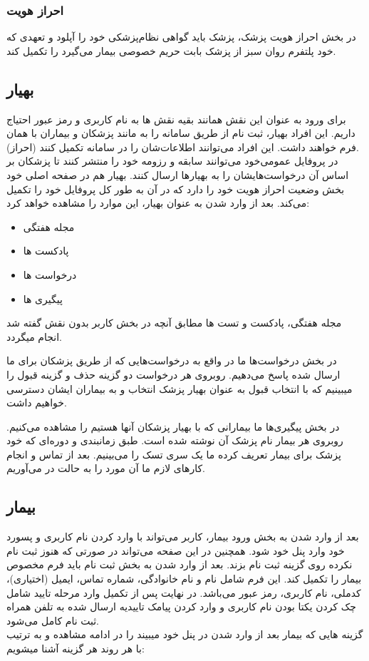 \documentclass[a4paper]{article}
\begin{document}
		\subsubsection{احراز هویت}
		در بخش احراز هویت پزشک، پزشک باید گواهی نظام‌پزشکی خود را آپلود و تعهدی که خود پلتفرم روان سبز از پزشک بابت حریم خصوصی بیمار می‌گیرد را تکمیل کند.
		
	\subsection{بهیار}

برای ورود به عنوان این نقش همانند بقیه نقش ها به نام کاربری و رمز عبور احتیاج داریم.
این افراد بهیار، ثبت نام از طریق سامانه را به مانند پزشکان و بیماران با همان فرم خواهند داشت. این افراد می‌توانند اطلاعات‌شان را در سامانه تکمیل کنند (احراز).\\
در پروفایل عمومی‌خود می‌توانند سابقه و رزومه خود را منتشر کنند تا پزشکان بر اساس آن درخواست‌هایشان را به بهیار‌ها ارسال کنند.
بهیار هم در صفحه اصلی خود بخش وضعیت احراز هویت خود را دارد که در آن به طور کل پروفایل خود را تکمیل می‌کند.
بعد از وارد شدن به عنوان بهیار، این موارد را مشاهده خواهد کرد:
		
		\begin{itemize}
			\item مجله هفتگی
			\item پادکست ها
			\item درخواست ها
			\item پیگیری ها
		\end{itemize}

مجله هفتگی، پادکست و تست ها مطابق آنچه در بخش کاربر بدون نقش گفته شد انجام میگردد.

در بخش درخواست‌ها ما در واقع به درخواست‌هایی که از طریق پزشکان برای ما ارسال شده پاسخ می‌دهیم. روبروی هر درخواست دو گزینه حذف و گزینه قبول را میبینیم که با انتخاب قبول به عنوان بهیار پزشک انتخاب و به بیماران ایشان دسترسی خواهیم داشت.

در بخش پیگیری‌ها ما بیمارانی که با بهیار پزشکان آنها هستیم را مشاهده می‌کنیم.
روبروی هر بیمار نام پزشک آن نوشته شده است.
طبق زمانبندی و دوره‌ای که خود پزشک برای بیمار تعریف کرده ما یک سری تسک را می‌بینیم.
بعد از تماس و انجام کارهای لازم ما آن مورد را به حالت  در می‌آوریم.

	\subsection{بیمار}
بعد از وارد شدن به بخش ورود بیمار، کاربر می‌تواند با وارد کردن نام کاربری و پسورد خود وارد پنل خود شود.
همچنین در این صفحه می‌تواند در صورتی که هنوز ثبت نام نکرده روی گزینه ثبت نام بزند. بعد از وارد شدن به بخش ثبت نام باید فرم مخصوص بیمار را تکمیل کند. این فرم شامل نام و نام خانوادگی، شماره تماس، ایمیل (اختیاری)، کدملی، نام کاربری، رمز عبور می‌باشد. در نهایت پس از تکمیل وارد مرحله تایید شامل چک کردن یکتا بودن نام کاربری و وارد کردن پیامک تاییدیه ارسال شده به تلفن همراه ثبت نام کامل می‌شود.
\\
گزینه هایی که بیمار بعد از وارد شدن در پنل خود میبیند را در ادامه مشاهده و به ترتیب با هر روند هر گزینه آشنا میشویم:
\end{document}

